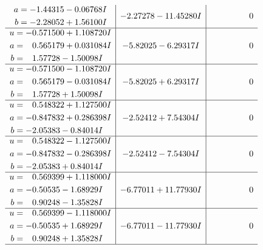 \documentclass[1p]{elsarticle_modified}
\theoremstyle{definition}
\begin{document}
$$\begin{array}{c|c|c}
\begin{aligned}
a &= -1.44315 - 0.06768 I \\
b &= -2.28052 + 1.56100 I\end{aligned}
 & -2.27278 - 11.45280 I & \phantom{-0.000000 } 0 \\ \hline\begin{aligned}
u &= -0.571500 + 1.108720 I \\
a &= \phantom{-}0.565179 + 0.031084 I \\
b &= \phantom{-}1.57728 - 1.50098 I\end{aligned}
 & -5.82025 - 6.29317 I & \phantom{-0.000000 } 0 \\ \hline\begin{aligned}
u &= -0.571500 - 1.108720 I \\
a &= \phantom{-}0.565179 - 0.031084 I \\
b &= \phantom{-}1.57728 + 1.50098 I\end{aligned}
 & -5.82025 + 6.29317 I & \phantom{-0.000000 } 0 \\ \hline\begin{aligned}
u &= \phantom{-}0.548322 + 1.127500 I \\
a &= -0.847832 + 0.286398 I \\
b &= -2.05383 - 0.84014 I\end{aligned}
 & -2.52412 + 7.54304 I & \phantom{-0.000000 } 0 \\ \hline\begin{aligned}
u &= \phantom{-}0.548322 - 1.127500 I \\
a &= -0.847832 - 0.286398 I \\
b &= -2.05383 + 0.84014 I\end{aligned}
 & -2.52412 - 7.54304 I & \phantom{-0.000000 } 0 \\ \hline\begin{aligned}
u &= \phantom{-}0.569399 + 1.118000 I \\
a &= -0.50535 - 1.68929 I \\
b &= \phantom{-}0.90248 - 1.35828 I\end{aligned}
 & -6.77011 + 11.77930 I & \phantom{-0.000000 } 0 \\ \hline\begin{aligned}
u &= \phantom{-}0.569399 - 1.118000 I \\
a &= -0.50535 + 1.68929 I \\
b &= \phantom{-}0.90248 + 1.35828 I\end{aligned}
 & -6.77011 - 11.77930 I & \phantom{-0.000000 } 0\\
 \hline 
 \end{array}$$\newpage$$\begin{array}{c|c|c}  

\end{array}$$
\end{document}

